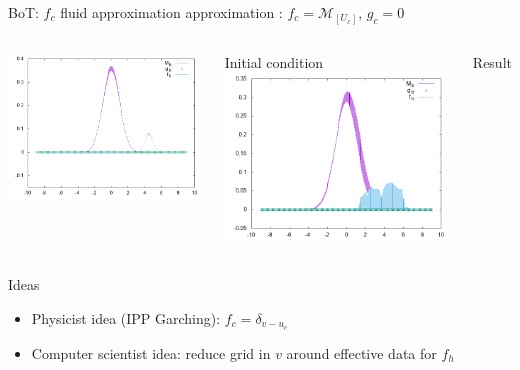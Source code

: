 \documentclass{beamer}
\begin{document}
  \begin{frame}{BoT: $f_c$ fluid approximation}
  	approximation : $f_c = \mathcal{M}_{[U_c]}$, $g_c = 0$
  	\begin{columns}[c]
        \includegraphics[width=\textwidth]{img/Mgbfhinit_coupe.png}

        Initial condition
        \includegraphics[width=\textwidth]{img/Mg0bfhvp_coupe.png}

        Result
    \end{columns}
  \end{frame}

  \begin{frame}{Ideas}
  	\begin{itemize}
  		\item Physicist idea (IPP Garching): $f_c = \delta_{v-u_c}$
  		\item Computer scientist idea: reduce grid in $v$ around effective data for $f_h$
  	\end{itemize}
  \end{frame}
\end{document}
